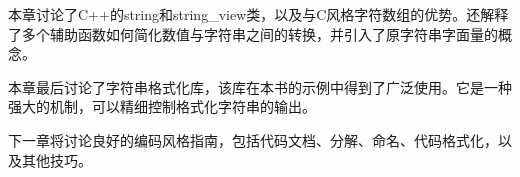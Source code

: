 本章讨论了C++的string和string\_view类，以及与C风格字符数组的优势。还解释了多个辅助函数如何简化数值与字符串之间的转换，并引入了原字符串字面量的概念。

本章最后讨论了字符串格式化库，该库在本书的示例中得到了广泛使用。它是一种强大的机制，可以精细控制格式化字符串的输出。

下一章将讨论良好的编码风格指南，包括代码文档、分解、命名、代码格式化，以及其他技巧。

